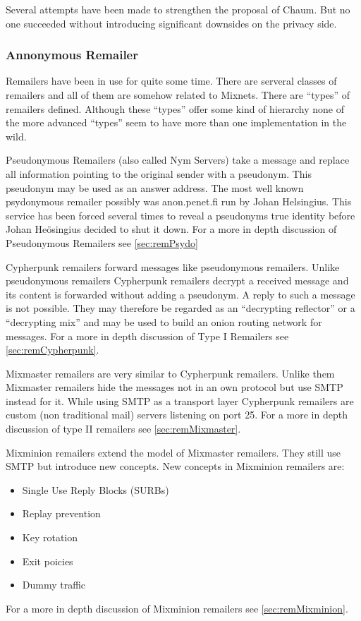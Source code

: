 Several attempts have been made to strengthen the proposal of Chaum\cite{golle:eurocrypt2004}\cite{disco}. But no one succeeded without introducing significant downsides on the privacy side.

\subsubsection{Annonymous Remailer\label{sec:remailer}}
Remailers have been in use for quite some time. There are serveral classes of remailers and all of them are somehow related to Mixnets. There are ``types'' of remailers defined. Although these ``types'' offer some kind of hierarchy none of the more advanced ``types'' seem to have more than one implementation in the wild. 

Pseudonymous Remailers (also called Nym Servers) take a message and replace all information pointing to the original sender with a pseudonym. This pseudonym may be used as an answer address. The most well known psydonymous remailer possibly was anon.penet.fi run by Johan Helsingius. This service has been forced several times to reveal a pseudonyms true identity before Johan Heösingius decided to shut it down. For a more in depth discussion of Pseudonymous Remailers see \ref{sec:remPsydo}

Cypherpunk remailers forward messages like pseudonymous remailers. Unlike pseudonymous remailers Cypherpunk remailers decrypt a received message and its content is forwarded without adding a pseudonym. A reply to such a message is not possible. They may therefore be regarded as an ``decrypting reflector'' or a ``decrypting mix'' and may be used to build an onion routing network for messages. For a more in depth discussion of Type I Remailers see \ref{sec:remCypherpunk}.

Mixmaster remailers are very similar to Cypherpunk remailers. Unlike them Mixmaster remailers hide the messages not in an own protocol but use SMTP instead for it. While using SMTP as a transport layer Cypherpunk remailers are custom (non traditional mail) servers listening on port 25. For a more in depth discussion of type II remailers see \ref{sec:remMixmaster}.

Mixminion remailers extend the model of Mixmaster remailers. They still use SMTP but introduce new concepts. New concepts in Mixminion remailers are:
\begin{itemize}
	\item Single Use Reply Blocks (SURBs)
	\item Replay prevention
	\item Key rotation
	\item Exit poicies
	\item Dummy traffic
\end{itemize}
For a more in depth discussion of Mixminion remailers see \ref{sec:remMixminion}.

